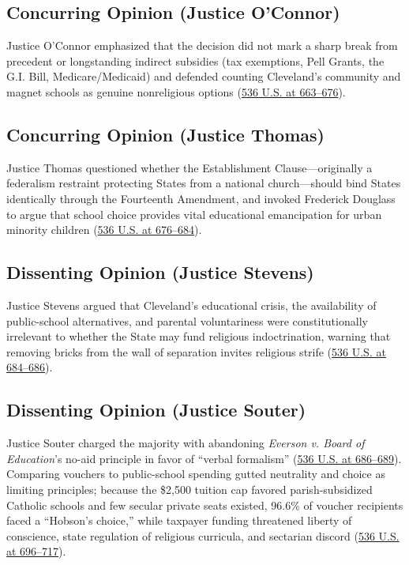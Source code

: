 \documentclass[12pt]{article}
\begin{document}
\subsection{Concurring Opinion (Justice O'Connor)}

Justice O'Connor emphasized that the decision did not mark a sharp break from precedent or longstanding indirect subsidies (tax exemptions, Pell Grants, the G.I. Bill, Medicare/Medicaid) and defended counting Cleveland's community and magnet schools as genuine nonreligious options (\href{https://supreme.justia.com/cases/federal/us/536/639/}{536 U.S. at 663--676}).

\subsection{Concurring Opinion (Justice Thomas)}

Justice Thomas questioned whether the Establishment Clause---originally a federalism restraint protecting States from a national church---should bind States identically through the Fourteenth Amendment, and invoked Frederick Douglass to argue that school choice provides vital educational emancipation for urban minority children (\href{https://supreme.justia.com/cases/federal/us/536/639/}{536 U.S. at 676--684}).

\subsection{Dissenting Opinion (Justice Stevens)}

Justice Stevens argued that Cleveland's educational crisis, the availability of public-school alternatives, and parental voluntariness were constitutionally irrelevant to whether the State may fund religious indoctrination, warning that removing bricks from the wall of separation invites religious strife (\href{https://supreme.justia.com/cases/federal/us/536/639/}{536 U.S. at 684--686}).

\subsection{Dissenting Opinion (Justice Souter)}

Justice Souter charged the majority with abandoning \emph{Everson v. Board of Education}'s no-aid principle in favor of ``verbal formalism'' (\href{https://supreme.justia.com/cases/federal/us/536/639/}{536 U.S. at 686--689}). Comparing vouchers to public-school spending gutted neutrality and choice as limiting principles; because the \$2,500 tuition cap favored parish-subsidized Catholic schools and few secular private seats existed, 96.6\% of voucher recipients faced a ``Hobson's choice,'' while taxpayer funding threatened liberty of conscience, state regulation of religious curricula, and sectarian discord (\href{https://supreme.justia.com/cases/federal/us/536/639/}{536 U.S. at 696--717}).
\end{document}
